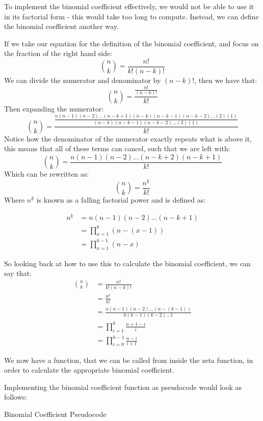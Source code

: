 \documentclass{article}
\begin{document}
To implement the binomial coefficient effectively, we would not be able to use it in its factorial form - this would take too long to compute. Instead, we can define the binomial coefficient another way.

If we take our equation for the definition of the binomial coefficient, and focus on the fraction of the right hand side:
$$\binom{n}{k} = \frac{n!}{k!(n-k)!}$$
We can divide the numerator and denominator by $(n-k)!$, then we have that:
$$\binom{n}{k} = \frac{\frac{n!}{(n-k)!}}{k!}$$
Then expanding the numerator:
$$\binom{n}{k} = \frac{\frac{n(n-1)(n-2)\dots(n-k+1)(n-k)(n-k-1)(n-k-2)\dots(2)(1)}{(n-k)(n-k-1)(n-k-2)\dots(2)(1)}}{k!}$$
Notice how the denominator of the numerator exactly repeats what is above it, this means that all of these terms can cancel, such that we are left with:
$$\binom{n}{k} = \frac{n(n-1)(n-2)\dots(n-k+2)(n-k+1)}{k!}$$
Which can be rewritten as:
$$\binom{n}{k} = \frac{n^{\underline{k}}}{k!}$$
Where $n^{\underline{k}}$ is known as a falling factorial power and is defined as:

\begin{align*}
    n^{\underline{k}} &= n(n-1)(n-2) \dots (n-k+1)\\
    &= \prod_{x=1}^k (n - (x - 1))\\
    &= \prod_{x=1}^{k-1} (n - x)
\end{align*}

So looking back at how to use this to calculate the binomial coefficient, we can say that:
\begin{align*}
    \binom{n}{k} &= \frac{n!}{k!(n-k)!}\\
    &= \frac{n^{\underline{k}}}{k!}\\
    &= \frac{n(n-1)(n-2)\dots (n-(k-1))}{k(k-1)(k-2) \dots 1}\\
    &= \prod^k_{i=1} \frac{n+1-i}{i}\\
    &= \prod^{k-1}_{i=0} \frac{n-i}{i+1}
\end{align*}

We now have a function, that we can be called from inside the zeta function, in order to calculate the appropriate binomial coefficient.

Implementing the binomial coefficient function as pseudocode would look as follows:

\begin{algorithm}[ht]
    \caption{Binomial Coefficient Pseudocode}
    \begin{algorithmic}
            \EndFor
        \EndFunction
    \end{algorithmic}
\end{algorithm}
\end{document}
